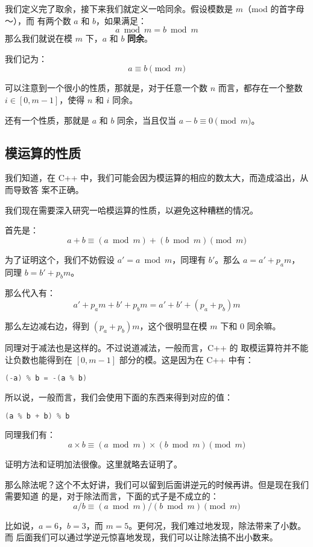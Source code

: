 \begin{frame}
我们定义完了取余，接下来我们就定义一哈同余。假设模数是 $m$（mod 的首字母～），而
有两个数 $a$ 和 $b$，如果满足：\[
    a \bmod m = b \bmod m
\]\pause
那么我们就说在模 $m$ 下，$a$ 和 $b$ \textbf{同余}。

我们记为：\[
    a \equiv b \pmod m
\]
\end{frame}

\begin{frame}
可以注意到一个很小的性质，那就是，对于任意一个数 $n$ 而言，都存在一个整数 $i \in
[0, m - 1]$，使得 $n$ 和 $i$ 同余。

还有一个性质，那就是 $a$ 和 $b$ 同余，当且仅当 $a - b \equiv 0 \pmod m$。
\end{frame}

\subsection{模运算的性质}

\begin{frame}
我们知道，在 C++ 中，我们可能会因为模运算的相应的数太大，而造成溢出，从而导致答
案不正确。

我们现在需要深入研究一哈模运算的性质，以避免这种糟糕的情况。

首先是：\[
    a + b \equiv (a \bmod m) + (b \bmod m) \pmod m
\] \pause

为了证明这个，我们不妨假设 $a' = a \bmod m$，同理有 $b'$。那么 $a = a' + p_a m$，
同理 $b = b' + p_b m$。

那么代入有：\[
    a' + p_a m + b' + p_b m = a' + b' + (p_a + p_b) m
\]

那么左边减右边，得到 $(p_a + p_b) m$，这个很明显在模 $m$ 下和 $0$ 同余嘛。
\end{frame}

\begin{frame}[fragile]
同理对于减法也是这样的。不过说道减法，一般而言，C++ 的 \cmd{\%} 取模运算符并不能
让负数也能得到在 $[0, m - 1]$ 部分的模。这是因为在 C++ 中有：
\begin{lstlisting}[language=C++]
(-a) % b = -(a % b)
\end{lstlisting}\pause
所以说，一般而言，我们会使用下面的东西来得到对应的值：
\begin{lstlisting}[language=C++]
(a % b + b) % b
\end{lstlisting}
\end{frame}

\begin{frame}
同理我们有：\[
    a \times b \equiv (a \bmod m) \times (b \bmod m) \pmod m
\] \pause

证明方法和证明加法很像。这里就略去证明了。
\end{frame}

\begin{frame}
那么除法呢？这个不太好讲，我们可以留到后面讲逆元的时候再讲。但是现在我们需要知道
的是，对于除法而言，下面的式子是不成立的：\[
    a / b \equiv (a \bmod m) / (b \bmod m) \pmod m
\]

比如说，$a = 6$，$b = 3$，而 $m = 5$。更何况，我们难过地发现，除法带来了小数。而
后面我们可以通过学逆元惊喜地发现，我们可以让除法搞不出小数来。
\end{frame}
